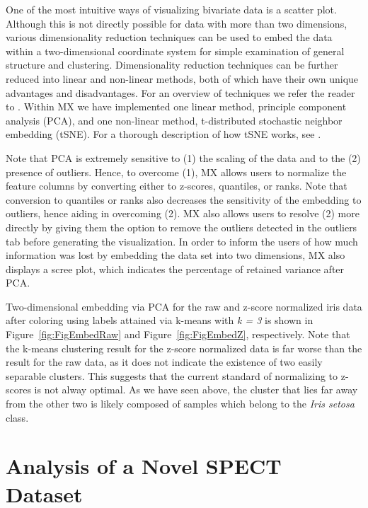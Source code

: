 \documentclass[12pt]{article}
\begin{document}
One of the most intuitive ways of visualizing bivariate data is a scatter plot. Although this is not directly possible for data with more than two dimensions, various dimensionality reduction techniques can be used to embed the data within a two-dimensional coordinate system for simple examination of general structure and clustering. Dimensionality reduction techniques can be further reduced into linear and non-linear methods, both of which have their own unique advantages and disadvantages. For an overview of techniques we refer the reader to \cite{van2009dimensionality}. Within MX we have implemented one linear method, principle component analysis (PCA), and one non-linear method, t-distributed stochastic neighbor embedding (tSNE). For a thorough description of how tSNE works, see \cite{van2008visualizing}.

Note that PCA is extremely sensitive to (1) the scaling of the data and to the (2) presence of outliers.  Hence, to overcome (1), MX allows users to normalize the feature columns by converting either to z-scores, quantiles, or ranks. Note that conversion to quantiles or ranks also decreases the sensitivity of the embedding to outliers, hence aiding in overcoming (2). MX also allows users to resolve (2) more directly by giving them the option to remove the outliers detected in the outliers tab before generating the visualization. In order to inform the users of how much information was lost by embedding the data set into two dimensions, MX also displays a scree plot, which indicates the percentage of retained variance after PCA. 

Two-dimensional embedding via PCA for the raw  and z-score normalized iris data after coloring using labels attained via k-means with \textit{k = 3} is shown in Figure~\ref{fig:FigEmbedRaw} and Figure~\ref{fig:FigEmbedZ}, respectively. Note that the k-means clustering result for the z-score normalized data is far worse than the result for the raw data, as it does not indicate the existence of two easily separable clusters. This suggests that the current standard of normalizing to z-scores is not alway optimal. As we have seen above, the cluster that lies far away from the other two is likely composed of samples which belong to the \textit{Iris setosa} class.

\section{Analysis of a Novel SPECT Dataset}
\end{document}
